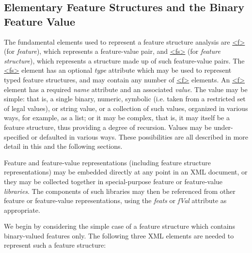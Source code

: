 \subsection[{Elementary Feature Structures and the Binary Feature Value}]{Elementary Feature Structures and the Binary Feature Value}\label{FSBI}\par
The fundamental elements used to represent a feature structure analysis are \hyperref[TEI.f]{<f>} (for \textit{feature}), which represents a feature-value pair, and \hyperref[TEI.fs]{<fs>} (for \textit{feature structure}), which represents a structure made up of such feature-value pairs. The \hyperref[TEI.fs]{<fs>} element has an optional {\itshape type} attribute which may be used to represent typed feature structures, and may contain any number of \hyperref[TEI.f]{<f>} elements. An \hyperref[TEI.f]{<f>} element has a required {\itshape name} attribute and an associated \textit{value}. The value may be simple: that is, a single binary, numeric, symbolic (i.e. taken from a restricted set of legal values), or string value, or a collection of such values, organized in various ways, for example, as a list; or it may be complex, that is, it may itself be a feature structure, thus providing a degree of recursion. Values may be under-specified or defaulted in various ways. These possibilities are all described in more detail in this and the following sections.\par
Feature and feature-value representations (including feature structure representations) may be embedded directly at any point in an XML document, or they may be collected together in special-purpose feature or feature-value \textit{libraries}. The components of such libraries may then be referenced from other feature or feature-value representations, using the {\itshape feats} or {\itshape fVal} attribute as appropriate.\par
We begin by considering the simple case of a feature structure which contains binary-valued features only. The following three XML elements are needed to represent such a feature structure: 
